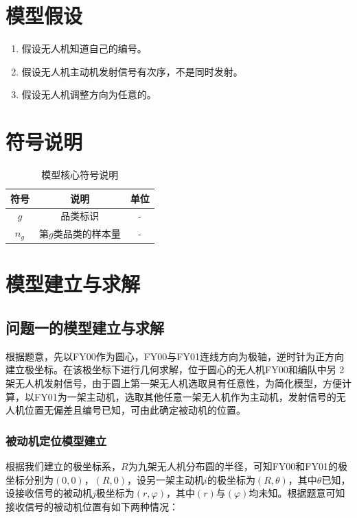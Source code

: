 \documentclass[withoutpreface,bwprint]{cumcmthesis} %
\begin{document}
\section{模型假设}

\begin{enumerate}
    \item 假设无人机知道自己的编号。
    \item 假设无人机主动机发射信号有次序，不是同时发射。
    \item 假设无人机调整方向为任意的。
\end{enumerate}

\section{符号说明}
\begin{table}[H]
    \centering
    \caption{模型核心符号说明}
    \label{表标签}
    \begin{tabular}{ccc} 
        \toprule[1.5pt]
        \textbf{符号} & \textbf{说明} & \textbf{单位} \\
        \midrule[1pt]
        $g$ & 品类标识 & - \\
        $n_g$ & 第$g$类品类的样本量 & - \\
        \bottomrule[1.5pt]
    \end{tabular}
\end{table}

\section{模型建立与求解}
\subsection{问题一的模型建立与求解}


根据题意，先以FY00作为圆心，FY00与FY01连线方向为极轴，逆时针为正方向建立极坐标。在该极坐标下进行几何求解，位于圆心的无人机FY00和编队中另 2 架无人机发射信号，由于圆上第一架无人机选取具有任意性，为简化模型，方便计算，以FY01为一架主动机，选取其他任意一架无人机作为主动机，发射信号的无人机位置无偏差且编号已知，可由此确定被动机的位置。

\subsubsection{被动机定位模型建立}

根据我们建立的极坐标系，$R$为九架无人机分布圆的半径，可知FY00和FY01的极坐标分别为$(0,0)$，$(R,0)$，设另一架主动机$i$的极坐标为$(R,\theta)$，其中$\theta$已知，设接收信号的被动机$j$极坐标为$(r,\varphi)$，其中$(r)$与$(\varphi)$均未知。根据题意可知接收信号的被动机位置有如下两种情况：
\end{document}
